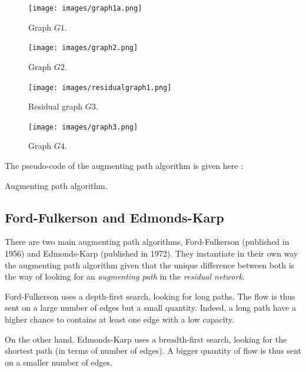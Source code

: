 \begin{figure}[h]
   \begin{minipage}[b]{0.40\linewidth}
      \centering \texttt{[image: images/graph1a.png]}
      \caption{Graph $G1$.}
   \end{minipage}\hfill
   \begin{minipage}[b]{0.48\linewidth}   
      \centering \texttt{[image: images/graph2.png]}
      \caption{Graph $G2$.}
   \end{minipage}\hfill
   \begin{minipage}[b]{0.48\linewidth}   
      \centering \texttt{[image: images/residualgraph1.png]}
      \caption{Residual graph $G3$.}
   \end{minipage}\hfill
   \begin{minipage}[b]{0.48\linewidth}  
      \centering \texttt{[image: images/graph3.png]}
      \caption{Graph $G4$.}
   \end{minipage}
\end{figure}


The pseudo-code of the augmenting path algorithm is given here :

\begin{algorithm}[h]

 \caption{Augmenting path algorithm.}
\end{algorithm}

\newpage
\subsection{Ford-Fulkerson and Edmonds-Karp}
There are two main augmenting path algorithms, Ford-Fulkerson (published in 1956) and Edmonds-Karp (published in 1972). They instantiate in their own way the augmenting path algorithm given that the unique difference between both is the way of looking for an \textit{augmenting path} in the \textit{residual network}. \newline

Ford-Fulkerson uses a depth-first search, looking for long paths. The flow is thus sent on a large number of edges but a small quantity. Indeed, a long path have a higher chance to contains at least one edge with a low capacity. \newline

On the other hand, Edmonds-Karp uses a breadth-first search, looking for the shortest path (in terms of number of edges). A bigger quantity of flow is thus sent on a smaller number of edges. \newline


